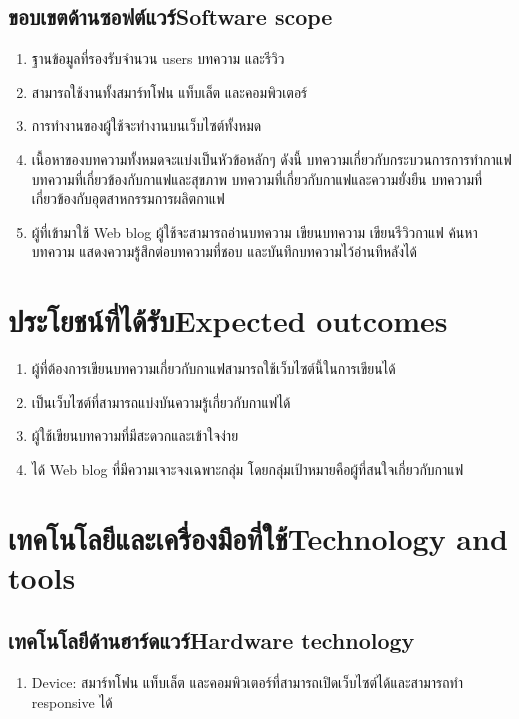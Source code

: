 \subsection{\ifcpe ขอบเขตด้านซอฟต์แวร์\else Software scope\fi}
\begin{enumerate}
    \item ฐานข้อมูลที่รองรับจำนวน users บทความ และรีวิว 
    \item สามารถใช้งานทั้งสมาร์ทโฟน แท็บเล็ต และคอมพิวเตอร์
    \item การทำงานของผู้ใช้จะทำงานบนเว็บไซต์ทั้งหมด
    \item เนื้อหาของบทความทั้งหมดจะแบ่งเป็นหัวข้อหลักๆ ดังนี้
    บทความเกี่ยวกับกระบวนการการทำกาแฟ บทความที่เกี่ยวข้องกับกาแฟและสุขภาพ บทความที่เกี่ยวกับกาแฟและความยั่งยืน บทความที่เกี่ยวข้องกับอุตสาหกรรมการผลิตกาแฟ
    \item ผู้ที่เข้ามาใช้ Web blog ผู้ใช้จะสามารถอ่านบทความ เขียนบทความ เขียนรีวิวกาแฟ ค้นหาบทความ แสดงความรู้สึกต่อบทความที่ชอบ และบันทึกบทความไว้อ่านทีหลังได้
\end{enumerate}
\section{\ifcpe ประโยชน์ที่ได้รับ\else Expected outcomes\fi}
\begin{enumerate}
    \item ผู้ที่ต้องการเขียนบทความเกี่ยวกับกาแฟสามารถใช้เว็บไซต์นี้ในการเขียนได้
    \item เป็นเว็บไซต์ที่สามารถแบ่งบันความรู้เกี่ยวกับกาแฟได้
    \item ผู้ใช้เขียนบทความที่มีสะดวกและเข้าใจง่าย
    \item ได้ Web blog ที่มีความเจาะจงเฉพาะกลุ่ม โดยกลุ่มเป้าหมายคือผู้ที่สนใจเกี่ยวกับกาแฟ
\end{enumerate}

\section{\ifcpe เทคโนโลยีและเครื่องมือที่ใช้\else Technology and tools\fi}

\subsection{\ifcpe เทคโนโลยีด้านฮาร์ดแวร์\else Hardware technology\fi}
\begin{enumerate}
    \item Device: สมาร์ทโฟน แท็บเล็ต และคอมพิวเตอร์ที่สามารถเปิดเว็บไซต์ได้และสามารถทำ responsive ได้
\end{enumerate}


